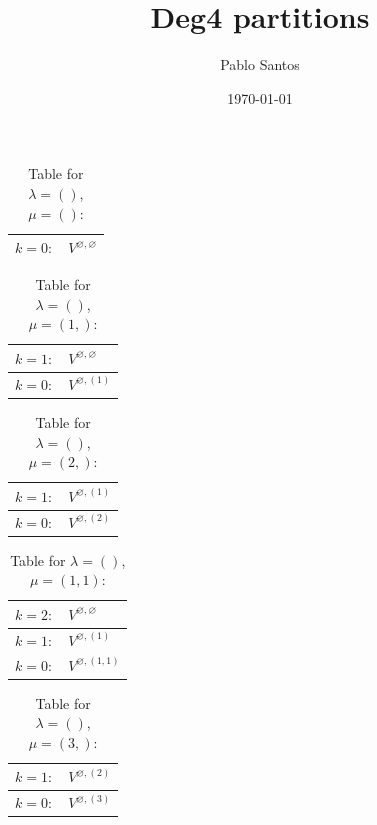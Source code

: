 \documentclass[a4paper,12pt]{article}
\title{Deg4 partitions}
\author{Pablo Santos}
\date{\today}
\begin{document}
\renewcommand{\arraystretch}{1.6} 
\begin{table}[H]
\centering
\caption{Table for $\lambda = ()$, $\mu = ()$:}
\begin{tabular}{|>{\centering\arraybackslash}p{15cm}|}
\hline
 $k = 0: \quad V^{\varnothing, \varnothing} $ \\ \hline
\end{tabular}
\end{table}

\renewcommand{\arraystretch}{1.6} 
\begin{table}[H]
\centering
\caption{Table for $\lambda = ()$, $\mu = (1,)$:}
\begin{tabular}{|>{\centering\arraybackslash}p{15cm}|}
\hline
 $k = 1: \quad V^{\varnothing, \varnothing} $ \\ \hline
 $k = 0: \quad V^{\varnothing, (1)} $ \\ \hline
\end{tabular}
\end{table}

\renewcommand{\arraystretch}{1.6} 
\begin{table}[H]
\centering
\caption{Table for $\lambda = ()$, $\mu = (2,)$:}
\begin{tabular}{|>{\centering\arraybackslash}p{15cm}|}
\hline
 $k = 1: \quad V^{\varnothing, (1)} $ \\ \hline
 $k = 0: \quad V^{\varnothing, (2)} $ \\ \hline
\end{tabular}
\end{table}

\renewcommand{\arraystretch}{1.6} 
\begin{table}[H]
\centering
\caption{Table for $\lambda = ()$, $\mu = (1, 1)$:}
\begin{tabular}{|>{\centering\arraybackslash}p{15cm}|}
\hline
 $k = 2: \quad V^{\varnothing, \varnothing} $ \\ \hline
 $k = 1: \quad V^{\varnothing, (1)} $ \\ \hline
 $k = 0: \quad V^{\varnothing, (1, 1)} $ \\ \hline
\end{tabular}
\end{table}

\renewcommand{\arraystretch}{1.6} 
\begin{table}[H]
\centering
\caption{Table for $\lambda = ()$, $\mu = (3,)$:}
\begin{tabular}{|>{\centering\arraybackslash}p{15cm}|}
\hline
 $k = 1: \quad V^{\varnothing, (2)} $ \\ \hline
 $k = 0: \quad V^{\varnothing, (3)} $ \\ \hline
\end{tabular}
\end{table}
\end{document}
